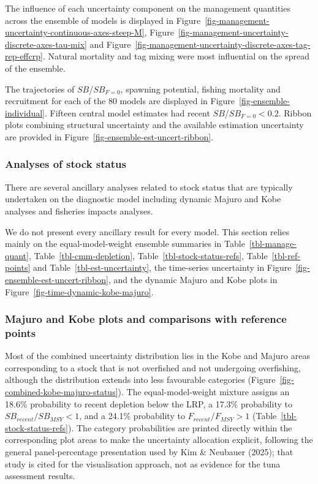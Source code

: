\documentclass[
  english,
  a4paper,
  a4paper,
  11pt]{SCreport}
\begin{document}
The influence of each uncertainty component on the management quantities
across the ensemble of models is displayed in
Figure~\ref{fig-management-uncertainty-continuous-axes-steep-M},
Figure~\ref{fig-management-uncertainty-discrete-axes-tau-mix} and
Figure~\ref{fig-management-uncertainty-discrete-axes-tag-rep-effcrp}.
Natural mortality and tag mixing were most influential on the spread of
the ensemble.

The trajectories of \(SB\)/\(SB_{F=0}\), spawning potential, fishing
mortality and recruitment for each of the 80 models are displayed in
Figure~\ref{fig-ensemble-individual}. Fifteen central model estimates
had recent \(SB\)/\(SB_{F=0}<0.2\). Ribbon plots combining structural
uncertainty and the available estimation uncertainty are provided in
Figure~\ref{fig-ensemble-est-uncert-ribbon}.

\subsubsection{Analyses of stock
status}\label{sec-stock-status-analysis}

There are several ancillary analyses related to stock status that are
typically undertaken on the diagnostic model including dynamic Majuro
and Kobe analyses and fisheries impacts analyses.

We do not present every ancillary result for every model. This section
relies mainly on the equal-model-weight ensemble summaries in
Table~\ref{tbl-manage-quant}, Table~\ref{tbl-cmm-depletion},
Table~\ref{tbl-stock-status-refs}, Table~\ref{tbl-ref-points} and
Table~\ref{tbl-est-uncertainty}, the time-series uncertainty in
Figure~\ref{fig-ensemble-est-uncert-ribbon}, and the dynamic Majuro and
Kobe plots in Figure~\ref{fig-time-dynamic-kobe-majuro}.

\subsubsection{Majuro and Kobe plots and comparisons with reference
points}\label{majuro-and-kobe-plots-and-comparisons-with-reference-points}

Most of the combined uncertainty distribution lies in the Kobe and
Majuro areas corresponding to a stock that is not overfished and not
undergoing overfishing, although the distribution extends into less
favourable categories (Figure~\ref{fig-combined-kobe-majuro-status}).
The equal-model-weight mixture assigns an 18.6\% probability to recent
depletion below the LRP, a 17.3\% probability to
\(SB_{recent}/SB_{MSY}<1\), and a 24.1\% probability to
\(F_{recent}/F_{MSY}>1\) (Table~\ref{tbl-stock-status-refs}). The
category probabilities are printed directly within the corresponding
plot areas to make the uncertainty allocation explicit, following the
general panel-percentage presentation used by Kim \& Neubauer (2025);
that study is cited for the visualisation approach, not as evidence for
the tuna assessment results.
\end{document}
